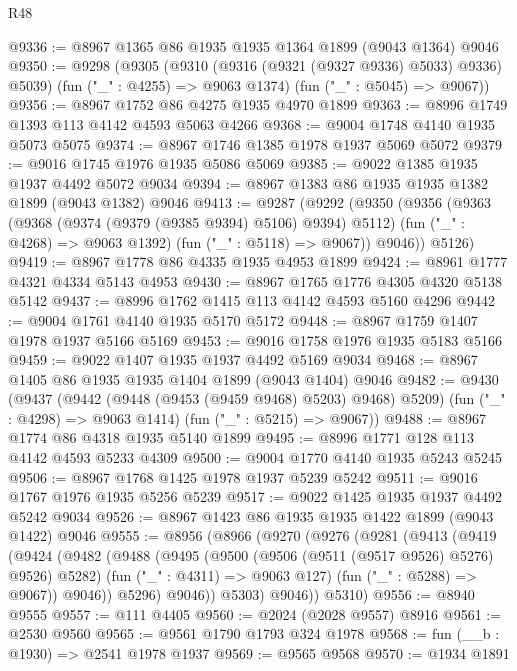 \begin{lexlean}{R48}
\begin{coremodule}
@9336 := @8967 @1365 @86 @1935 @1935 @1364 @1899 (@9043 @1364) @9046
@9350 := @9298
    (@9305
      (@9310 (@9316 (@9321 (@9327 @9336) @5033) @9336) @5039)
      (fun ("_" : @4255) => @9063 @1374)
      (fun ("_" : @5045) => @9067))
@9356 := @8967 @1752 @86 @4275 @1935 @4970 @1899
@9363 := @8996 @1749 @1393 @113 @4142 @4593 @5063 @4266
@9368 := @9004 @1748 @4140 @1935 @5073 @5075
@9374 := @8967 @1746 @1385 @1978 @1937 @5069 @5072
@9379 := @9016 @1745 @1976 @1935 @5086 @5069
@9385 := @9022 @1385 @1935 @1937 @4492 @5072 @9034
@9394 := @8967 @1383 @86 @1935 @1935 @1382 @1899 (@9043 @1382) @9046
@9413 := @9287
    (@9292
      (@9350
        (@9356
          (@9363
            (@9368 (@9374 (@9379 (@9385 @9394) @5106) @9394) @5112)
            (fun ("_" : @4268) => @9063 @1392)
            (fun ("_" : @5118) => @9067))
          @9046))
      @5126)
@9419 := @8967 @1778 @86 @4335 @1935 @4953 @1899
@9424 := @8961 @1777 @4321 @4334 @5143 @4953
@9430 := @8967 @1765 @1776 @4305 @4320 @5138 @5142
@9437 := @8996 @1762 @1415 @113 @4142 @4593 @5160 @4296
@9442 := @9004 @1761 @4140 @1935 @5170 @5172
@9448 := @8967 @1759 @1407 @1978 @1937 @5166 @5169
@9453 := @9016 @1758 @1976 @1935 @5183 @5166
@9459 := @9022 @1407 @1935 @1937 @4492 @5169 @9034
@9468 := @8967 @1405 @86 @1935 @1935 @1404 @1899 (@9043 @1404) @9046
@9482 := @9430
    (@9437
      (@9442 (@9448 (@9453 (@9459 @9468) @5203) @9468) @5209)
      (fun ("_" : @4298) => @9063 @1414)
      (fun ("_" : @5215) => @9067))
@9488 := @8967 @1774 @86 @4318 @1935 @5140 @1899
@9495 := @8996 @1771 @128 @113 @4142 @4593 @5233 @4309
@9500 := @9004 @1770 @4140 @1935 @5243 @5245
@9506 := @8967 @1768 @1425 @1978 @1937 @5239 @5242
@9511 := @9016 @1767 @1976 @1935 @5256 @5239
@9517 := @9022 @1425 @1935 @1937 @4492 @5242 @9034
@9526 := @8967 @1423 @86 @1935 @1935 @1422 @1899 (@9043 @1422) @9046
@9555 := @8956
    (@8966
      (@9270
        (@9276
          (@9281
            (@9413
              (@9419
                (@9424
                  (@9482
                    (@9488
                      (@9495
                        (@9500 (@9506 (@9511 (@9517 @9526) @5276) @9526) @5282)
                        (fun ("_" : @4311) => @9063 @127)
                        (fun ("_" : @5288) => @9067))
                      @9046))
                  @5296)
                @9046))
            @5303)
          @9046))
      @5310)
@9556 := @8940 @9555
@9557 := @111 @4405
@9560 := @2024 (@2028 @9557) @8916
@9561 := @2530 @9560
@9565 := @9561 @1790 @1793 @324 @1978
@9568 := fun (__b : @1930) => @2541 @1978 @1937
@9569 := @9565 @9568
@9570 := @1934 @1891

\end{coremodule}
\end{lexlean}
